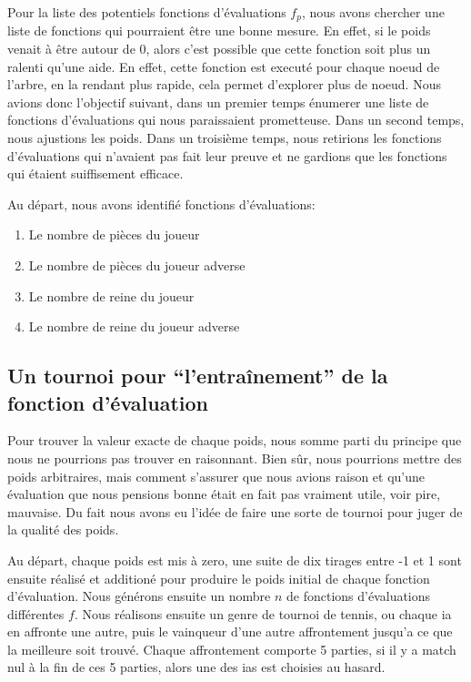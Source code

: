\documentclass[a4paper,11pt]{article}
\begin{document}
\begin{multicols}{2}[]
    Pour la liste des potentiels fonctions d'évaluations $f_{p}$, nous avons
    chercher une liste de fonctions qui pourraient être une bonne mesure. En
    effet, si le poids venait à être autour de 0, alors c'est possible que cette
    fonction soit plus un ralenti qu'une aide. En effet, cette fonction est
    executé pour chaque noeud de l'arbre, en la rendant plus rapide, cela permet
    d'explorer plus de noeud. Nous avions donc l'objectif suivant, dans un
    premier temps énumerer une liste de fonctions d'évaluations qui nous
    paraissaient prometteuse. Dans un second temps, nous ajustions les poids.
    Dans un troisième temps, nous retirions les fonctions d'évaluations qui
    n'avaient pas fait leur preuve et ne gardions que les fonctions qui étaient
    suiffisement efficace.

    Au départ, nous avons identifié fonctions d'évaluations:

    \begin{enumerate}
      \item Le nombre de pièces du joueur
      \item Le nombre de pièces du joueur adverse
      \item Le nombre de reine du joueur
      \item Le nombre de reine du joueur adverse
    \end{enumerate}

  \subsection{Un tournoi pour ``l'entraînement'' de la fonction d'évaluation}

    Pour trouver la valeur exacte de chaque poids, nous somme parti du principe
    que nous ne pourrions pas trouver en raisonnant. Bien sûr, nous pourrions
    mettre des poids arbitraires, mais comment s'assurer que nous avions raison
    et qu'une évaluation que nous pensions bonne était en fait pas vraiment
    utile, voir pire, mauvaise. Du fait nous avons eu l'idée de faire une sorte
    de tournoi pour juger de la qualité des poids.

    Au départ, chaque poids est mis à zero, une suite de dix tirages entre -1 et
    1 sont ensuite réalisé et additioné pour produire le poids initial de chaque
    fonction d'évaluation. Nous générons ensuite un nombre $n$ de fonctions
    d'évaluations différentes $f$. Nous réalisons ensuite un genre de tournoi de
    tennis, ou chaque ia en affronte une autre, puis le vainqueur d'une autre
    affrontement jusqu'a ce que la meilleure soit trouvé. Chaque affrontement
    comporte 5 parties, si il y a match nul à la fin de ces 5 parties, alors une
    des ias est choisies au hasard.


\end{multicols}
\end{document}
